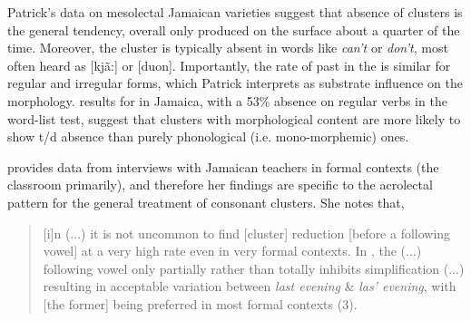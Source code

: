   Patrick’s data on mesolectal Jamaican varieties suggest that absence of clusters is the general tendency, overall only produced on the surface about a quarter of the time.  Moreover, the cluster is typically absent in words like \textit{can’t} or \textit{don’t}, most often heard as [kjã:] or [duon].  Importantly, the rate of past  in the  is similar for regular and irregular forms, which Patrick interprets as substrate  influence on the morphology.   results for  in Jamaica, with a 53\% absence on regular verbs in the word-list test, suggest that clusters with morphological content are more likely to show t/d absence than purely phonological (i.e. mono-morphemic) ones.

\citet{Shields1984} provides data from interviews with Jamaican teachers in formal contexts (the classroom primarily), and therefore her findings are specific to the acrolectal pattern for the general treatment of consonant clusters.  She notes that,

\begin{quote}
	[i]n  (...) it is not uncommon to find [cluster] reduction [before a following vowel] at a very high rate even in very formal contexts.  In , the (...) following vowel only partially rather than totally inhibits simplification (...) resulting in acceptable variation between  \textit{last evening} \& \textit{las’ evening}, with [the former] being preferred in most formal contexts (3).
\end{quote}


